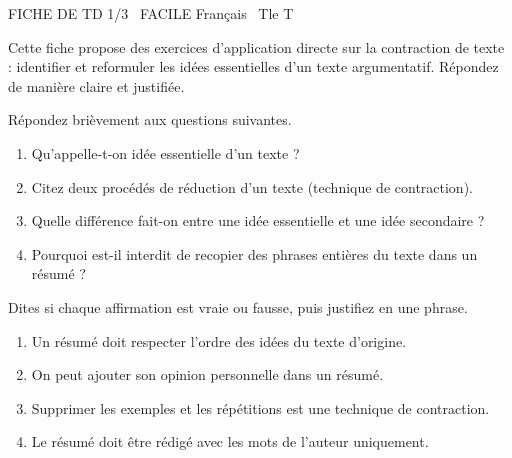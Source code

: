 \documentclass[11pt]{article}
\begin{document}
\begin{tcolorbox}[enhanced,colback=popink,colframe=popink,arc=10pt,boxrule=0pt,left=12pt,right=12pt,top=9pt,bottom=9pt]
{\color{white}\popxbold\small FICHE DE TD 1/3 \textbullet\ FACILE \hfill Français \textbullet\ Tle T\par}
\end{tcolorbox}
\vspace{4pt}
Cette fiche propose des exercices d'application directe sur la contraction de texte : identifier et reformuler les idées essentielles d'un texte argumentatif. Répondez de manière claire et justifiée.

\begin{exercice}
Répondez brièvement aux questions suivantes.
\begin{enumerate}
\item Qu'appelle-t-on \og idée essentielle \fg{} d'un texte ?
\item Citez deux procédés de réduction d'un texte (technique de contraction).
\item Quelle différence fait-on entre une idée essentielle et une idée secondaire ?
\item Pourquoi est-il interdit de recopier des phrases entières du texte dans un résumé ?
\end{enumerate}
\end{exercice}

\begin{exercice}
Dites si chaque affirmation est vraie ou fausse, puis justifiez en une phrase.
\begin{enumerate}
\item Un résumé doit respecter l'ordre des idées du texte d'origine.
\item On peut ajouter son opinion personnelle dans un résumé.
\item Supprimer les exemples et les répétitions est une technique de contraction.
\item Le résumé doit être rédigé avec les mots de l'auteur uniquement.
\end{enumerate}
\end{exercice}
\end{document}
